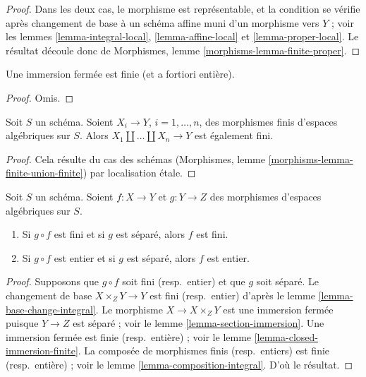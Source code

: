 \begin{proof}
Dans les deux cas, le morphisme est représentable, et la condition se vérifie
après changement de base à un schéma affine muni d'un morphisme vers $Y$ ; voir les
lemmes \ref{lemma-integral-local}, \ref{lemma-affine-local} et
\ref{lemma-proper-local}. Le résultat découle donc de
Morphismes, lemme \ref{morphisms-lemma-finite-proper}.
\end{proof}

\begin{lemma}
\label{lemma-closed-immersion-finite}
Une immersion fermée est finie (et a fortiori entière).
\end{lemma}

\begin{proof}
Omis.
\end{proof}

\begin{lemma}
\label{lemma-finite-union-finite}
Soit $S$ un schéma.
Soient $X_i \to Y$, $i = 1, \ldots, n$, des morphismes finis
d'espaces algébriques sur $S$.
Alors $X_1 \amalg \ldots \amalg X_n \to Y$ est également fini.
\end{lemma}

\begin{proof}
Cela résulte du cas des schémas
(Morphismes, lemme \ref{morphisms-lemma-finite-union-finite})
par localisation étale.
\end{proof}

\begin{lemma}
\label{lemma-finite-permanence}
Soit $S$ un schéma.
Soient $f : X \to Y$ et $g : Y \to Z$ des morphismes d'espaces algébriques sur $S$.
\begin{enumerate}
\item Si $g \circ f$ est fini et si $g$ est séparé, alors $f$ est fini.
\item Si $g \circ f$ est entier et si $g$ est séparé, alors $f$ est entier.
\end{enumerate}
\end{lemma}

\begin{proof}
Supposons que $g \circ f$ soit fini (resp.\ entier) et que $g$ soit séparé.
Le changement de base $X \times_Z Y \to Y$ est fini (resp.\ entier) d'après le
lemme \ref{lemma-base-change-integral}.
Le morphisme $X \to X \times_Z Y$ est
une immersion fermée puisque $Y \to Z$ est séparé ; voir le
lemme \ref{lemma-section-immersion}.
Une immersion fermée est finie (resp.\ entière) ;
voir le lemme \ref{lemma-closed-immersion-finite}.
La composée de morphismes finis (resp.\ entiers) est finie
(resp.\ entière) ;
voir le lemme \ref{lemma-composition-integral}. D'où le résultat.
\end{proof}





